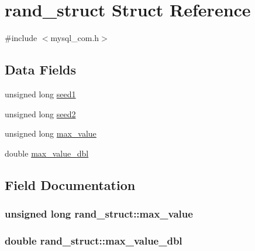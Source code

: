 \hypertarget{structrand__struct}{}\section{rand\+\_\+struct Struct Reference}
\label{structrand__struct}


{\ttfamily \#include $<$mysql\+\_\+com.\+h$>$}

\subsection*{Data Fields}
\begin{DoxyCompactItemize}
\item 
unsigned long \hyperlink{structrand__struct_af410f208f593fc00c0da9f9a52ef4e23}{seed1}
\item 
unsigned long \hyperlink{structrand__struct_a894bfb516e85d530834c0078656d7ba4}{seed2}
\item 
unsigned long \hyperlink{structrand__struct_aa374a9fa21ec3f989e3fdb22629bc27f}{max\+\_\+value}
\item 
double \hyperlink{structrand__struct_aaaa74e72077639ceb95c0e91cad5bcc8}{max\+\_\+value\+\_\+dbl}
\end{DoxyCompactItemize}


\subsection{Field Documentation}
\hypertarget{structrand__struct_aa374a9fa21ec3f989e3fdb22629bc27f}{}
\subsubsection[{max\+\_\+value}]{\setlength{\rightskip}{0pt plus 5cm}unsigned long rand\+\_\+struct\+::max\+\_\+value}\label{structrand__struct_aa374a9fa21ec3f989e3fdb22629bc27f}
\hypertarget{structrand__struct_aaaa74e72077639ceb95c0e91cad5bcc8}{}
\subsubsection[{max\+\_\+value\+\_\+dbl}]{\setlength{\rightskip}{0pt plus 5cm}double rand\+\_\+struct\+::max\+\_\+value\+\_\+dbl}\label{structrand__struct_aaaa74e72077639ceb95c0e91cad5bcc8}
\hypertarget{structrand__struct_af410f208f593fc00c0da9f9a52ef4e23}{}
